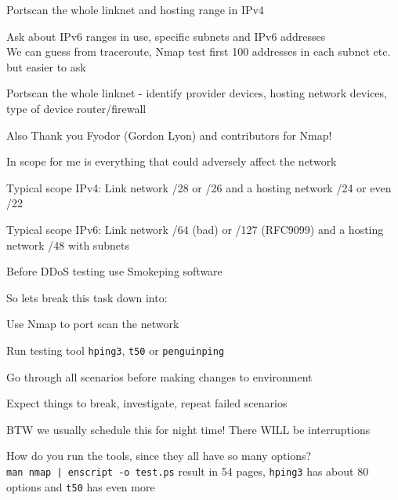 \documentclass[Screen16to9,17pt]{foils}
\begin{document}



\begin{list2}
\item Portscan the whole linknet and hosting range in IPv4
\item Ask about IPv6 ranges in use, specific subnets and IPv6 addresses\\
We can guess from traceroute, Nmap test first 100 addresses in each subnet etc. but easier to ask
\item Portscan the whole linknet - identify provider devices, hosting network devices, type of device router/firewall
\item Also Thank you Fyodor (Gordon Lyon) and contributors for Nmap!
\end{list2}





\begin{list2}
\item In scope for me is everything that could adversely affect the network
\item Typical scope IPv4: Link network /28 or /26 and a hosting network /24 or even /22
\item Typical scope IPv6: Link network /64 (bad) or /127 (RFC9099) and a hosting network /48 with subnets
\end{list2}




\centerline{Before DDoS testing  use Smokeping software}



So lets break this task down into:
\begin{list2}
\item Use Nmap to port scan the network
\item Run testing tool \verb+hping3+, \verb+t50+ or \verb+penguinping+
\item Go through all scenarios before making changes to environment
\item Expect things to break, investigate, repeat failed scenarios
\vskip 1cm
\item BTW we usually schedule this for night time! There WILL be interruptions
\vskip 1cm
\item How do you run the tools, since they all have so many options?\\
\verb+man nmap | enscript -o test.ps+ result in 54 pages,
\verb+hping3+ has about 80 options and \verb+t50+ has even more
\end{list2}
\end{document}
